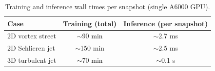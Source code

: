 \begin{table}[htbp]
  \centering
  \caption{Training and inference wall times per snapshot (single A6000 GPU).}
  \label{tab:et:timing}
  \begin{tabular}{lcc}
    \toprule
    Case & Training (total) & Inference (per snapshot) \\
    \midrule
    2D vortex street & $\sim$90 min  & $\sim$2.7 ms \\
    2D Schlieren jet & $\sim$150 min & $\sim$2.5 ms \\
    3D turbulent jet & $\sim$70 min  & $\sim$0.1 s \\
    \bottomrule
  \end{tabular}
\end{table}
